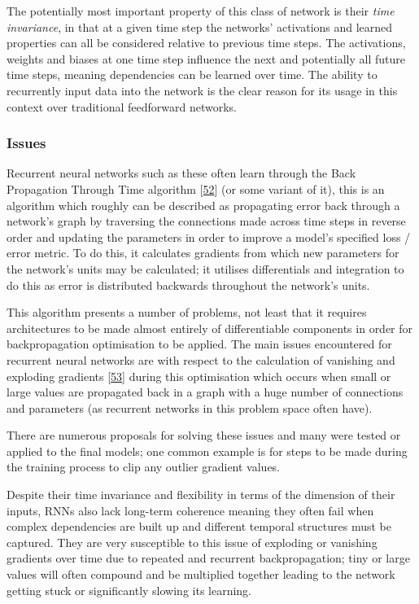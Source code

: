 \documentclass[12pt,]{article}
\begin{document}
The potentially most important property of this class of network is
their \emph{time invariance}, in that at a given time step the networks'
activations and learned properties can all be considered relative to
previous time steps. The activations, weights and biases at one time
step influence the next and potentially all future time steps, meaning
dependencies can be learned over time. The ability to recurrently input
data into the network is the clear reason for its usage in this context
over traditional feedforward networks.

\hypertarget{issues}{%
\subsubsection{Issues}\label{issues}}

Recurrent neural networks such as these often learn through the Back
Propagation Through Time algorithm
{[}\protect\hyperlink{ref-werbos1990backpropagation}{52}{]} (or some
variant of it), this is an algorithm which roughly can be described as
propagating error back through a network's graph by traversing the
connections made across time steps in reverse order and updating the
parameters in order to improve a model's specified loss / error metric.
To do this, it calculates gradients from which new parameters for the
network's units may be calculated; it utilises differentials and
integration to do this as error is distributed backwards throughout the
network's units.

This algorithm presents a number of problems, not least that it requires
architectures to be made almost entirely of differentiable components in
order for backpropagation optimisation to be applied. The main issues
encountered for recurrent neural networks are with respect to the
calculation of vanishing and exploding gradients
{[}\protect\hyperlink{ref-pascanu2012understanding}{53}{]} during this
optimisation which occurs when small or large values are propagated back
in a graph with a huge number of connections and parameters (as
recurrent networks in this problem space often have).

There are numerous proposals for solving these issues and many were
tested or applied to the final models; one common example is for steps
to be made during the training process to clip any outlier gradient
values.

Despite their time invariance and flexibility in terms of the dimension
of their inputs, RNNs also lack long-term coherence meaning they often
fail when complex dependencies are built up and different temporal
structures must be captured. They are very susceptible to this issue of
exploding or vanishing gradients over time due to repeated and recurrent
backpropagation; tiny or large values will often compound and be
multiplied together leading to the network getting stuck or
significantly slowing its learning.
\end{document}
